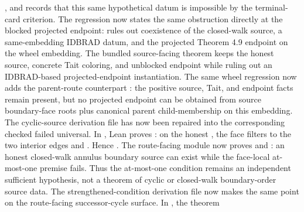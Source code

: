 \documentclass[11pt]{article}
\begin{document}
,
and
records that this same hypothetical datum is impossible by the terminal-card
criterion.
The regression now states the same obstruction directly at the blocked
projected endpoint:
rules out coexistence of the closed-walk source, a same-embedding IDBRAD datum,
and the projected Theorem 4.9 endpoint on the wheel embedding.  The bundled
source-facing theorem
keeps the honest source, concrete Tait coloring, and unblocked endpoint while
ruling out an IDBRAD-based projected-endpoint instantiation.
The same wheel regression now adds the parent-route counterpart
:
the positive source, Tait, and endpoint facts remain present, but no projected
endpoint can be obtained from source boundary-face roots plus canonical parent
child-membership on this embedding.
The cyclic-source derivation file has now been repaired into the corresponding
checked failed universal.  In
, Lean proves
: on the honest
, the face  filters to
the two interior edges  and .  Hence
.  The route-facing
module  now proves
 and
: an
honest closed-walk annulus boundary source can exist while the face-local
at-most-one premise fails.  Thus the at-most-one condition remains an
independent sufficient hypothesis, not a theorem of cyclic or closed-walk
boundary-order source data.
The strengthened-condition derivation file now makes the same point on the
route-facing successor-cycle surface.  In
, the theorem
\end{document}
